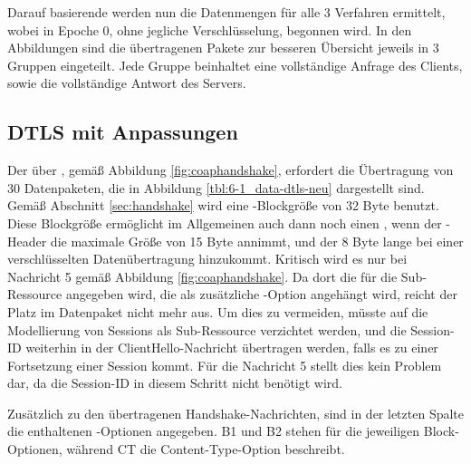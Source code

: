 Darauf basierende werden nun die Datenmengen für alle 3 Verfahren ermittelt, wobei in Epoche 0, ohne jegliche Verschlüsselung, begonnen wird.
In den Abbildungen sind die übertragenen Pakete zur besseren Übersicht jeweils in 3 Gruppen eingeteilt. Jede Gruppe beinhaltet eine vollständige
Anfrage des Clients, sowie die vollständige Antwort des Servers.

\subsection{DTLS mit Anpassungen}
\label{sec:new-dtls}

Der  über , gemäß Abbildung \ref{fig:coaphandshake}, erfordert die Übertragung von 30 Datenpaketen, die in Abbildung
\ref{tbl:6-1_data-dtls-neu} dargestellt sind. Gemäß Abschnitt \ref{sec:handshake} wird eine -Blockgröße von 32 Byte benutzt. Diese
Blockgröße ermöglicht im Allgemeinen auch dann noch einen , wenn der -Header die maximale Größe von 15 Byte annimmt, und der 8 Byte
lange  bei einer verschlüsselten Datenübertragung hinzukommt. Kritisch wird es nur bei Nachricht 5 gemäß Abbildung \ref{fig:coaphandshake}.
Da dort die  für die Sub-Ressource angegeben wird, die als zusätzliche -Option angehängt wird, reicht der Platz im Datenpaket
nicht mehr aus. Um dies zu vermeiden, müsste auf die Modellierung von Sessions als Sub-Ressource verzichtet werden, und die Session-ID weiterhin
in der ClientHello-Nachricht übertragen werden, falls es zu einer Fortsetzung einer Session kommt. Für die Nachricht 5 stellt dies kein Problem dar,
da die Session-ID in diesem Schritt nicht benötigt wird.

Zusätzlich zu den übertragenen Handshake-Nachrichten, sind in der letzten Spalte die enthaltenen -Optionen angegeben. B1 und B2 stehen
für die jeweiligen Block-Optionen, während CT die Content-Type-Option beschreibt.

